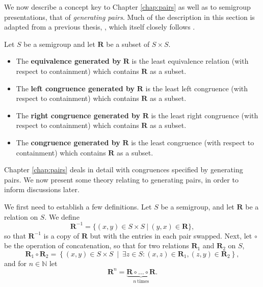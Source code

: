 We now describe a concept key to Chapter \ref{chap:pairs} as well as to
semigroup presentations, that of \textit{generating pairs}.  Much of the
description in this section is adapted from a previous thesis,
\cite{mtorpey_msc}, which itself closely follows \cite[\S1.4--1.5]{howie}.

\begin{definition}
  \label{def:gen-pairs}
  Let $S$ be a semigroup and let $\mathbf{R}$ be a subset of $S \times S$.
  \begin{itemize}
  \item The \textbf{equivalence generated by} $\mathbf{R}$ is the least
    equivalence relation (with respect to containment) which contains
    $\mathbf{R}$ as a subset.
  \item The \textbf{left congruence generated by} $\mathbf{R}$ is the least left
    congruence (with respect to containment) which contains $\mathbf{R}$ as a
    subset.
  \item The \textbf{right congruence generated by} $\mathbf{R}$ is the least
    right congruence (with respect to containment) which contains $\mathbf{R}$
    as a subset.
  \item The \textbf{congruence generated by} $\mathbf{R}$ is the least
    congruence (with respect to containment) which contains $\mathbf{R}$ as a
    subset.
  \end{itemize}
\end{definition}

Chapter \ref{chap:pairs} deals in detail with congruences specified by
generating pairs.  We now present some theory relating to generating pairs, in
order to inform discussions later.

We first need to establish a few definitions.  Let $S$ be a semigroup, and let
$\mathbf{R}$ be a relation on $S$.  We define
$$\mathbf{R}^{-1} = \{(x,y) \in S \times S ~|~ (y,x) \in \mathbf{R}\},$$
so that $\mathbf{R}^{-1}$ is a copy of $\mathbf{R}$ but with the entries in each
pair swapped. 
Next, let $\circ$ be the operation of concatenation, so that for two relations
$\mathbf{R}_1$ and $\mathbf{R}_2$ on $S$,
$$\mathbf{R}_1 \circ \mathbf{R}_2 = \left\{(x,y) \in S \times S ~\middle|~
  \exists z \in S: (x,z) \in \mathbf{R}_1, (z,y) \in \mathbf{R}_2\right\},$$
and for $n \in \mathbb{N}$ let
$$\mathbf{R}^n = \underbrace{\mathbf{R} \circ \dots \circ \mathbf{R}}_{n~\text{times}}.$$


